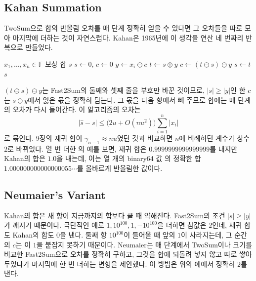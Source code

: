 \subsection{Kahan Summation}

TwoSum으로 합의 반올림 오차를 매 단계 정확히 얻을 수 있다면 그 오차들을 따로 모아 마지막에 더하는 것이 자연스럽다. Kahan은 1965년에 이 생각을 연산 네 번짜리 반복으로 만들었다\cite{kahan1965}.

\begin{algorithm}[t]
\begin{algorithmic}[1]
\Require $x_1,\dots,x_n\in\mathbb F$
\Ensure 보상 합 $s$
\State $s\gets0$, $c\gets0$ 
  \State $y\gets x_i\ominus c$ 
  \State $t\gets s\oplus y$
  \State $c\gets(t\ominus s)\ominus y$ 
  \State $s\gets t$
\EndFor
\State \Return $s$
\end{algorithmic}
\caption{Kahan의 보상 합}
\label{alg:kahan}
\end{algorithm}

$(t\ominus s)\ominus y$는 Fast2Sum의 둘째와 셋째 줄을 부호만 바꾼 것이므로, $|s|\ge|y|$인 한 $c$는 $s\oplus y$에서 잃은 몫을 정확히 담는다. 그 몫을 다음 항에서 빼 주므로 합에는 매 단계의 오차가 다시 들어간다. 이 알고리즘의 오차는
\[
|\hat s-s|\le\bigl(2u+O(nu^2)\bigr)\sum_{i=1}^n|x_i|
\]
로 묶인다\cite{goldberg1991,higham2002accuracy}. 9장의 재귀 합이 $\gamma_{n-1}\approx nu$였던 것과 비교하면 $n$에 비례하던 계수가 상수 $2$로 바뀌었다. 열 번 더한 의 예를 보면, 재귀 합은 $0.9999999999999999$를 내지만 Kahan의 합은 $1.0$을 내는데, 이는 열 개의 binary64 값 의 정확한 합 $1.000000000000000055\cdots$를 올바르게 반올림한 값이다.

\subsection{Neumaier's Variant}

Kahan의 합은 새 항이 지금까지의 합보다 클 때 약해진다. Fast2Sum의 조건 $|s|\ge|y|$가 깨지기 때문이다. 극단적인 예로 $1,10^{100},1,-10^{100}$을 더하면 참값은 $2$인데, 재귀 합도 Kahan의 합도 $0$을 낸다. 둘째 항 $10^{100}$이 들어올 때 앞의 $1$이 사라지는데, 그 순간의 $c$는 이 $1$을 붙잡지 못하기 때문이다. Neumaier는 매 단계에서 TwoSum이나 크기를 비교한 Fast2Sum으로 오차를 정확히 구하고, 그것을 합에 되돌려 넣지 않고 따로 쌓아 두었다가 마지막에 한 번 더하는 변형을 제안했다\cite{neumaier1974}. 이 방법은 위의 예에서 정확히 $2$를 낸다.

